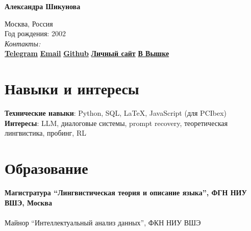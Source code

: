 \documentclass[11pt]{article} %
\begin{document}


{\LARGE\bfseries Александра Шикунова} %
\bigskip\bigskip\medskip %

Москва, Россия\\
Год рождения: 2002\\

\textit{Контакты:}\\
\textbf{\href{https://t.me/thnlgrlivrlvdwsbrnwthrssnhrys}{Telegram}} \hspace*{2em}
\textbf{\href{mailto:notalexandrashikunova@gmail.com}{Email}} \hspace*{2em}
\textbf{\href{https://github.com/poisongrapevine}{Github}} \hspace*{2em}
\textbf{\href{https://thddbptnsndshs.github.io/academic_site/}{Личный сайт}} \hspace*{2em}
\textbf{\href{https://www.hse.ru/org/persons/401664223}{В Вышке}}
\medskip %


\section*{Навыки и интересы}

\textbf{Технические навыки}: Python, SQL, LaTeX, JavaScript (для PCIbex)\\
\textbf{Интересы}: LLM, диалоговые системы, prompt recovery, теоретическая лингвистика, пробинг, RL


\section*{Образование}

\textbf{Магистратура ``Лингвистическая теория и описание языка'', ФГН НИУ ВШЭ, Москва}\\
\\
 Майнор ``Интеллектуальный анализ данных'', ФКН НИУ ВШЭ
\end{document}
